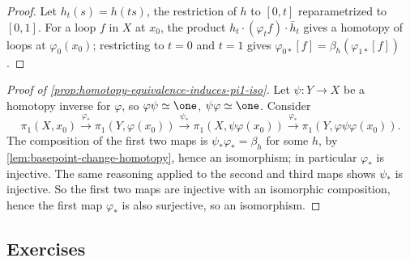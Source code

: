 \begin{proof}
Let $h_t(s) = h(ts)$, the restriction of $h$ to $[0,t]$ reparametrized to $[0,1]$. For a
loop $f$ in $X$ at $x_0$, the product $h_t\cdot(\varphi_t f)\cdot\bar h_t$ gives a homotopy of loops at
$\varphi_0(x_0)$; restricting to $t=0$ and $t=1$ gives $\varphi_{0*}[f] = \beta_h(\varphi_{1*}[f])$.
\end{proof}



\begin{proof}[Proof of \cref{prop:homotopy-equivalence-induces-pi1-iso}]
Let $\psi : Y \to X$ be a homotopy inverse for $\varphi$, so $\varphi\psi\simeq\one$, $\psi\varphi\simeq\one$.
Consider
\[
\pi_1(X,x_0) \xrightarrow{\varphi_*} \pi_1(Y,\varphi(x_0)) \xrightarrow{\psi_*} \pi_1(X,\psi\varphi(x_0))
\xrightarrow{\varphi_*} \pi_1(Y,\varphi\psi\varphi(x_0)).
\]
The composition of the first two maps is $\psi_*\varphi_* = \beta_h$ for some $h$, by
\cref{lem:basepoint-change-homotopy}, hence an isomorphism; in particular $\varphi_*$ is
injective. The same reasoning applied to the second and third maps shows $\psi_*$ is
injective. So the first two maps are injective with an isomorphic composition, hence
the first map $\varphi_*$ is also surjective, so an isomorphism.
\end{proof}

\subsection*{Exercises}

